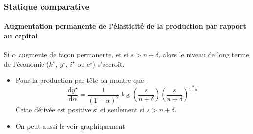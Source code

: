 \documentclass[10pt,notheorems]{beamer}
\theoremstyle{plain}
\theoremstyle{definition} %
\begin{document}
\begin{frame}
  \frametitle{Statique comparative}
  \framesubtitle{Augmentation permanente de l'élasticité de la production par rapport au capital}

  \bigskip

  \begin{block}{}
    Si $\alpha$ augmente de façon permanente, et si $s>n+\delta$, alors le niveau de long terme de l'économie ($k^{\star}$, $y^{\star}$, $i^{\star}$ ou $c^{\star}$) s'accroît.
  \end{block}

  \bigskip

  \begin{itemize}

  \item Pour la production par tête on montre que~:
    \[
      \frac{\mathrm d y^{\star}}{\mathrm d \alpha} = \frac{1}{(1-\alpha)^2}\log\left(\frac{s}{n+\delta}\right)\left(\frac{s}{n+\delta}\right)^{\frac{\alpha}{1-\alpha}}
    \]
    Cette dérivée est positive si et seulement si $s>n+\delta$.\newline

  \item On peut aussi le voir graphiquement.
  \end{itemize}

\end{frame}
\end{document}
